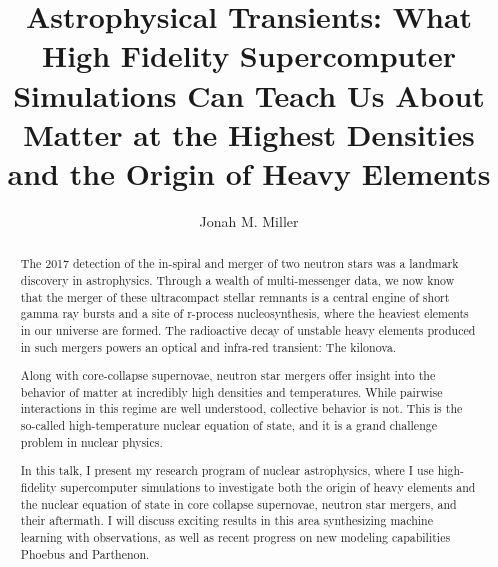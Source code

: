 \documentclass[letter,nofootinbib,superscriptaddress,twocolumn]{revtex4-1}
\begin{document}
\title{Astrophysical Transients: What High Fidelity Supercomputer
  Simulations Can Teach Us About Matter at the Highest Densities and
  the Origin of Heavy Elements}

\author{Jonah M. Miller}

\begin{abstract}

  The 2017 detection of the in-spiral and merger of two neutron stars
  was a landmark discovery in astrophysics. Through a wealth of
  multi-messenger data, we now know that the merger of these
  ultracompact stellar remnants is a central engine of short gamma ray
  bursts and a site of r-process nucleosynthesis, where the heaviest
  elements in our universe are formed. The radioactive decay of
  unstable heavy elements produced in such mergers powers an optical
  and infra-red transient: The kilonova.

  Along with core-collapse supernovae, neutron star mergers offer
  insight into the behavior of matter at incredibly high densities and
  temperatures. While pairwise interactions in this regime are well
  understood, collective behavior is not. This is the so-called
  high-temperature nuclear equation of state, and it is a grand
  challenge problem in nuclear physics.

  In this talk, I present my research program of nuclear astrophysics,
  where I use high-fidelity supercomputer simulations to investigate
  both the origin of heavy elements and the nuclear equation of state
  in core collapse supernovae, neutron star mergers, and their
  aftermath. I will discuss exciting results in this area synthesizing
  machine learning with observations, as well as recent progress on
  new modeling capabilities Phoebus and Parthenon.

\end{abstract}

\maketitle
\end{document}
